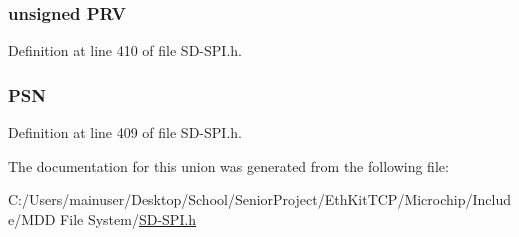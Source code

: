 \subsubsection[{P\+R\+V}]{\setlength{\rightskip}{0pt plus 5cm}unsigned P\+R\+V}\label{union_c_i_d_ae7063e98e2b95855058a6b78b92f1d90}


Definition at line 410 of file S\+D-\/\+S\+P\+I.\+h.

\hypertarget{union_c_i_d_a0b91d996158c8f32cc8719881ec1c35b}{}
\subsubsection[{P\+S\+N}]{ P\+S\+N}\label{union_c_i_d_a0b91d996158c8f32cc8719881ec1c35b}


Definition at line 409 of file S\+D-\/\+S\+P\+I.\+h.



The documentation for this union was generated from the following file\+:\begin{DoxyCompactItemize}
\item 
C\+:/\+Users/mainuser/\+Desktop/\+School/\+Senior\+Project/\+Eth\+Kit\+T\+C\+P/\+Microchip/\+Include/\+M\+D\+D File System/\hyperlink{_s_d-_s_p_i_8h}{S\+D-\/\+S\+P\+I.\+h}\end{DoxyCompactItemize}
